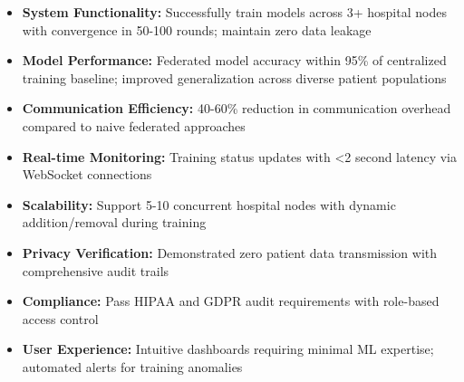 \begin{itemize}[noitemsep]
    \item \textbf{System Functionality:} Successfully train models across 3+ hospital nodes with convergence in 50-100 rounds; maintain zero data leakage
    \item \textbf{Model Performance:} Federated model accuracy within 95\% of centralized training baseline; improved generalization across diverse patient populations
    \item \textbf{Communication Efficiency:} 40-60\% reduction in communication overhead compared to naive federated approaches
    \item \textbf{Real-time Monitoring:} Training status updates with <2 second latency via WebSocket connections
    \item \textbf{Scalability:} Support 5-10 concurrent hospital nodes with dynamic addition/removal during training
    \item \textbf{Privacy Verification:} Demonstrated zero patient data transmission with comprehensive audit trails
    \item \textbf{Compliance:} Pass HIPAA and GDPR audit requirements with role-based access control
    \item \textbf{User Experience:} Intuitive dashboards requiring minimal ML expertise; automated alerts for training anomalies
\end{itemize}
